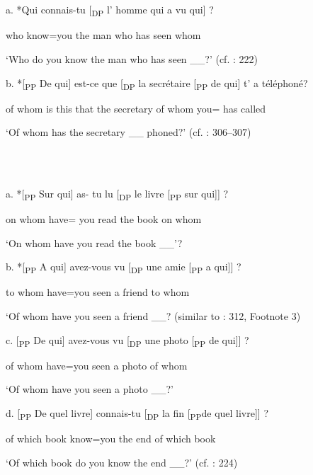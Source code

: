 \documentclass[output=paper]{langsci/langscibook}
\begin{document}
\ea%
    \label{ex:key:1}
    \gll\\
        \\
    \glt
    \z

          a.  *Qui  connais-tu [\textsubscript{DP}  l’  homme  qui     a   vu  qui] ?

    who  know=you    the  man    who    has  seen  whom

‘Who do you know the man who has seen \_\_?’ (cf. \citealt{Sportiche1981}: 222)

  b.   *[\textsubscript{PP} De  qui]  est-ce que [\textsubscript{DP}  la  secrétaire  [\textsubscript{PP}  de  qui]      t’  a  téléphoné?

      of  whom   is this that  the  secretary    of  whom  you=        has called

    ‘Of whom has the secretary \_\_ phoned?’ (cf. \citealt{Tellier1990}: 306–307)

\ea%
    \label{ex:key:2}
    \gll\\
        \\
    \glt
    \z

          a.  *[\textsubscript{PP} Sur qui]  as-    tu  lu  [\textsubscript{DP}  le  livre [\textsubscript{PP}  sur qui]] ?

      on  whom  have=  you  read  the  book  on whom

    ‘On whom have you read the book \_\_’? 

  b.  *[\textsubscript{PP}  A qui]    avez-vous vu [\textsubscript{DP}  une  amie [\textsubscript{PP}  a qui]] ?

      to whom  have=you seen  a  friend    to whom

    ‘Of whom have you seen a friend \_\_? (similar to \citealt{Grosu1974}: 312, Footnote 3)

  c.   [\textsubscript{PP}  De  qui]     avez-vous vu  [\textsubscript{DP} une  photo [\textsubscript{PP}  de  qui]] ?

      of  whom  have=you seen  a  photo    of  whom

    ‘Of whom have you seen a photo \_\_?’

  d.   [\textsubscript{PP}  De quel livre]  connais-tu [\textsubscript{DP}  la  fin   [\textsubscript{PP}de quel livre]] ?

      of which book  know=you    the  end  of which book

    ‘Of which book do you know the end \_\_?’ (cf. \citealt{Sportiche1981}: 224)
\end{document}
